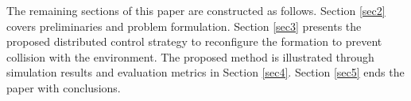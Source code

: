 The remaining sections of this paper are constructed as follows. Section \ref{sec2} covers preliminaries and problem formulation. Section \ref{sec3} presents the proposed distributed control strategy to reconfigure the formation to prevent collision with the environment. The proposed method is illustrated through simulation results and evaluation metrics in Section \ref{sec4}. Section \ref{sec5} ends the paper with conclusions.

